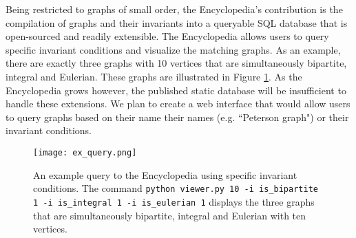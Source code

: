 \documentclass[12pt]{article}
\begin{document}
Being restricted to graphs of small order, the Encyclopedia's contribution is the compilation of graphs and their invariants into a queryable SQL database that is open-sourced and readily extensible. 
The Encyclopedia allows users to query specific invariant conditions and visualize the matching graphs.
As an example, there are exactly three graphs with 10 vertices that are simultaneously bipartite, integral and Eulerian. 
These graphs are illustrated in Figure \ref{fig:examplequery}.
As the Encyclopedia grows however, the published static database will be insufficient to handle these extensions.
We plan to create a web interface that would allow users to query graphs based on their name their names (e.g. ``Peterson graph") or their invariant conditions.

\begin{figure}[p]
\begin{center}
  \texttt{[image: ex\_query.png]}
\end{center}
  \caption{
    An example query to the Encyclopedia using specific invariant conditions. 
    The command \texttt{python viewer.py 10 -i is\_bipartite 1 -i is\_integral 1 -i is\_eulerian 1} displays the three graphs that are simultaneously bipartite, integral and Eulerian with ten vertices. 
  }
  \label{fig:examplequery}
\end{figure}


\clearpage %






\newpage %
\end{document}
